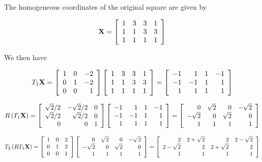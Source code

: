 \documentclass[12pt]{article}
\newcommand{\nin}{\noindent}
\newcommand{\vthree}{\vspace{3mm}}
\newcommand{\myp}[1]{\left( #1 \right)}
\newcommand{\mymat}[1]{
\left[
\begin{array}{rrrrrrrrrrrrrrrrrrrrrrrrrrrrrrrrrrrrrrr}
#1
\end{array}
\right]
}
\begin{document}
\vthree

\nin The homogeneous coordinates of the original square are given by

\[
{\bf X} =
\mymat{
1 & 3 & 3 & 1 \\
1 & 1 & 3 & 3 \\
1 & 1 & 1 & 1 \\
}
\]

\vthree

\nin We then have

\[
T_1 {\bf X} =
\mymat{
1 & 0 &-2 \\
0 & 1 &-2 \\
0 & 0 & 1 \\
}
\mymat{
1 & 3 & 3 & 1 \\
1 & 1 & 3 & 3 \\
1 & 1 & 1 & 1 \\
}
=
\mymat{
-1 & 1 & 1 &-1 \\
-1 &-1 & 1 & 1 \\
1  & 1 & 1 & 1 \\
}
\]

\vthree

\[
R\myp{T_1 {\bf X}} =
\mymat{
\sqrt{2}/2 & -\sqrt{2}/2 & 0 \\
\sqrt{2}/2 & \sqrt{2}/2 & 0 \\
0 & 0 & 1 \\
}
\mymat{
-1 & 1 & 1 &-1 \\
-1 &-1 & 1 & 1 \\
1  & 1 & 1 & 1 \\
}
=
\mymat{
0         & \sqrt{2} & 0        &-\sqrt{2} \\
-\sqrt{2} & 0        & \sqrt{2} & 0 \\
1  & 1 & 1 & 1 \\
}
\]

\vthree

\[
T_2\myp{RT_1 {\bf X}} =
\mymat{
1 & 0 & 2 \\
0 & 1 & 2 \\
0 & 0 & 1 \\
}
\mymat{
0         & \sqrt{2} & 0        &-\sqrt{2} \\
-\sqrt{2} & 0        & \sqrt{2} & 0 \\
1  & 1 & 1 & 1 \\
}
=
\mymat{
2         & 2+\sqrt{2} & 2        &2-\sqrt{2} \\
2-\sqrt{2} & 2        & 2+\sqrt{2} & 2 \\
1  & 1 & 1 & 1 \\
}
\]
\end{document}
